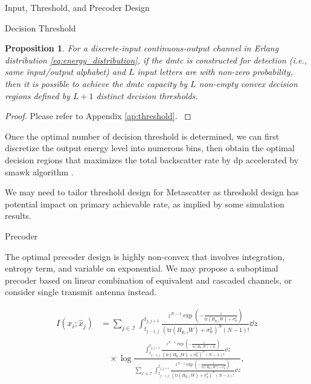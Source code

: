 \documentclass[journal]{IEEEtran}
\newtheorem{proposition}{Proposition}
\begin{document}
\begin{section}{Input, Threshold, and Precoder Design}
\begin{subsection}{Decision Threshold}
		\begin{proposition}
			For a discrete-input continuous-output channel in Erlang distribution \eqref{eq:energy_distribution}, if the \gls{dmtc} is constructed for detection (i.e., same input/output alphabet) and $L$ input letters are with non-zero probability, then it is possible to achieve the \gls{dmtc} capacity by $L$ non-empty convex decision regions defined by $L+1$ distinct decision thresholds.
			\label{pr:threshold}
		\end{proposition}

		\begin{proof}
			Please refer to Appendix \ref{ap:threshold}.
			\label{pf:threshold}
		\end{proof}

		Once the optimal number of decision threshold is determined, we can first discretize the output energy level into numerous bins, then obtain the optimal decision regions that maximizes the total backscatter rate by \gls{dp} accelerated by \gls{smawk} algorithm \cite{He2021}.

		\begin{tcolorbox}
			We may need to tailor threshold design for Metascatter as threshold design has potential impact on primary achievable rate, as implied by some simulation results.
		\end{tcolorbox}
	\end{subsection}

	\begin{subsection}{Precoder}
		\begin{tcolorbox}
			The optimal precoder design is highly non-convex that involves integration, entropy term, and variable on exponential.
			We may propose a suboptimal precoder based on linear combination of equivalent and cascaded channels, or consider single transmit antenna instead.
		\end{tcolorbox}
		\begin{align}
			I(x_i;\hat{x}_j)
			 & = \sum_{j \in \mathcal{I}} \int_{t_{j-1,j}}^{t_{j,j+1}} \frac{z^{N-1} \exp \left(-\frac{z}{\mathrm{tr}(H_{\mathrm{E},i} W) + \sigma_w^2}\right)}{\left(\mathrm{tr}(H_{\mathrm{E},i} W) + \sigma_w^2\right)^N (N-1)!} \dd z\nonumber                                                                                                                                                                                                                    \\
			 & \quad \times \log \frac{\int_{t_{j-1,j}}^{t_{j,j+1}} \frac{z^{N-1} \exp \left(-\frac{z}{\mathrm{tr}(H_{\mathrm{E},i} W) + \sigma_w^2}\right)}{\left(\mathrm{tr}(H_{\mathrm{E},i} W) + \sigma_w^2\right)^N (N-1)!} \dd z}{\sum_{i' \in \mathcal{I}} \int_{t_{j-1,j}}^{t_{j,j+1}} \frac{z^{N-1} \exp \left(-\frac{z}{\mathrm{tr}(H_{\mathrm{E},i'} W) + \sigma_w^2}\right)}{\left(\mathrm{tr}(H_{\mathrm{E},i'} W) + \sigma_w^2\right)^N (N-1)!} \dd z},
		\end{align}
	\end{subsection}
\end{section}
\end{document}

